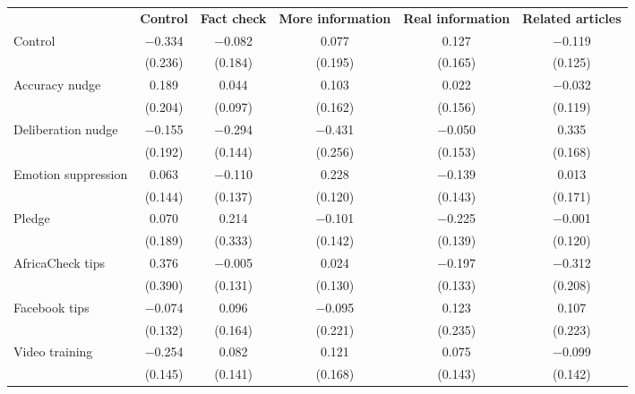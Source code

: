 
\begin{tabular}[t]{lccccc}
 & \textbf{Control} & \textbf{Fact check} & \textbf{More information} & \textbf{Real information} & \textbf{Related articles}\\ 
 \cmidrule(lr){2-2} \cmidrule(lr){3-3}\cmidrule(lr){4-4}\cmidrule(lr){5-5}\cmidrule(lr){6-6}
Control & \num{-0.334} & \num{-0.082} & \num{0.077} & \num{0.127} & \num{-0.119}\\
 & (\num{0.236}) & (\num{0.184}) & (\num{0.195}) & (\num{0.165}) & (\num{0.125})\\
Accuracy nudge & \num{0.189} & \num{0.044} & \num{0.103} & \num{0.022} & \num{-0.032}\\
 & (\num{0.204}) & (\num{0.097}) & (\num{0.162}) & (\num{0.156}) & (\num{0.119})\\
Deliberation nudge & \num{-0.155} & \num{-0.294} & \num{-0.431} & \num{-0.050} & \num{0.335}\\
 & (\num{0.192}) & (\num{0.144}) & (\num{0.256}) & (\num{0.153}) & (\num{0.168})\\
Emotion suppression & \num{0.063} & \num{-0.110} & \num{0.228} & \num{-0.139} & \num{0.013}\\
 & (\num{0.144}) & (\num{0.137}) & (\num{0.120}) & (\num{0.143}) & (\num{0.171})\\
Pledge & \num{0.070} & \num{0.214} & \num{-0.101} & \num{-0.225} & \num{-0.001}\\
 & (\num{0.189}) & (\num{0.333}) & (\num{0.142}) & (\num{0.139}) & (\num{0.120})\\
AfricaCheck tips & \num{0.376} & \num{-0.005} & \num{0.024} & \num{-0.197} & \num{-0.312}\\
 & (\num{0.390}) & (\num{0.131}) & (\num{0.130}) & (\num{0.133}) & (\num{0.208})\\
Facebook tips & \num{-0.074} & \num{0.096} & \num{-0.095} & \num{0.123} & \num{0.107}\\
 & (\num{0.132}) & (\num{0.164}) & (\num{0.221}) & (\num{0.235}) & (\num{0.223})\\
Video training & \num{-0.254} & \num{0.082} & \num{0.121} & \num{0.075} & \num{-0.099}\\
 & (\num{0.145}) & (\num{0.141}) & (\num{0.168}) & (\num{0.143}) & (\num{0.142})\\
\end{tabular}
